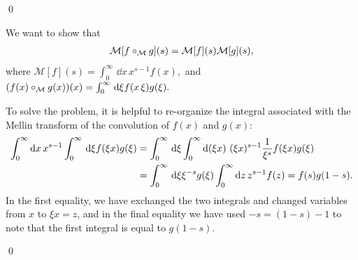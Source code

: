 \qed{}


We want to show that
\begin{align}
    \mathcal{M}[f \circ_{\mathcal{M}} g](s) = \mathcal{M}[f](s) \mathcal{M}[g](s)
    ,
\end{align}
where
\(
    \mathcal{M}[f](s) = \int_0^\infty \,\dd x\, x^{s-1} f(x)
    ,
\)
and
\(
    (f(x) \circ_{\mathcal{M}} g(x))(x)
    =
    \int_0^\infty\,\dd\xi f(x\,\xi) g(\xi)
    .
\)


To solve the problem, it is helpful to re-organize the integral associated with the Mellin transform of the convolution of \(f(x)\) and \(g(x)\):
\begin{align}
    \int_0^\infty \dd x\, x^{s-1}
    \int_0^\infty \, \dd \xi
    f(\xi x) g(\xi)
    &=
    \int_0^\infty \, \dd \xi
    \int_0^\infty \dd (\xi x)\, (\xi x)^{s-1}
    \frac{1}{\xi^s}
    f(\xi x) g(\xi)
    \\
    \notag
    &=
    \int_0^\infty \, \dd \xi
    \xi^{-s}
    g(\xi)
    \int_0^\infty \dd z\, z^{s-1}
    f(z)
    =
    f(s) g(1-s)
    .
\end{align}
In the first equality, we have exchanged the two integrals and changed variables from \(x\) to \(\xi x = z\), and in the final equality we have used \(-s = (1-s) - 1\) to note that the first integral is equal to \(g(1-s)\).

\qed{}
\fi
